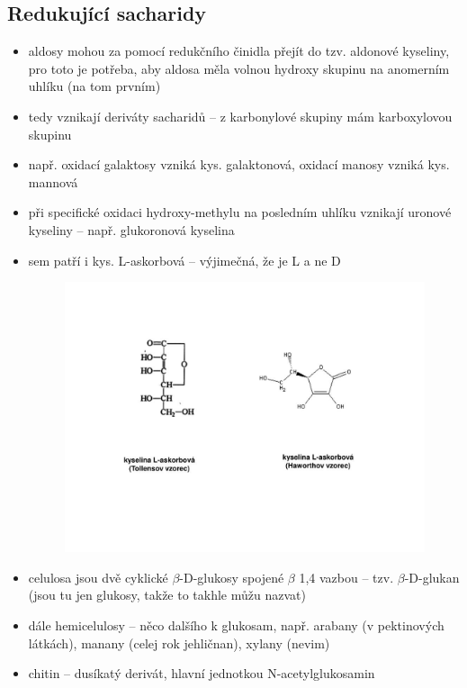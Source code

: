 \documentclass{article}
\begin{document}
\subsection{Redukující sacharidy}
\begin{itemize}
  \item aldosy mohou za pomocí redukčního činidla přejít do tzv. aldonové kyseliny, pro toto je potřeba, aby aldosa měla volnou hydroxy skupinu na anomerním uhlíku (na tom prvním)
  \item tedy vznikají deriváty sacharidů -- z karbonylové skupiny mám karboxylovou skupinu
  \item např. oxidací galaktosy vzniká kys. galaktonová, oxidací manosy vzniká kys. mannová
  \item při specifické oxidaci hydroxy-methylu na posledním uhlíku vznikají uronové kyseliny -- např. glukoronová kyselina
  \item sem patří i kys. L-askorbová -- výjimečná, že je L a ne D
  \begin{figure}[h]
      \includegraphics[width=\linewidth]{askorbova.png}
      \caption{}
  \end{figure}
  \item celulosa jsou dvě cyklické $\beta$-D-glukosy spojené $\beta$ 1,4 vazbou -- tzv. $\beta$-D-glukan (jsou tu jen glukosy, takže to takhle můžu nazvat)
  \item dále hemicelulosy -- něco dalšího k glukosam, např. arabany (v pektinových látkách), manany (celej rok jehličnan), xylany (nevim)
  \item  chitin -- dusíkatý derivát, hlavní jednotkou N-acetylglukosamin

\end{itemize}
\end{document}
